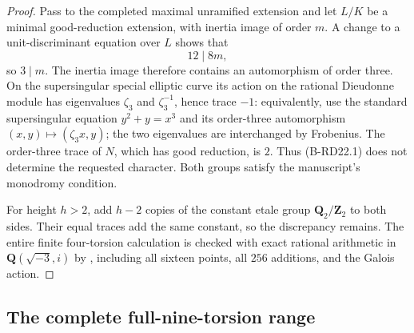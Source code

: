 \begin{proof}
Pass to the completed maximal unramified extension and let $L/K$
be a minimal good-reduction extension, with inertia image of order
$m$. A change to a unit-discriminant equation over $L$ shows that
\[
                            12\mid8m,
\]
so $3\mid m$. The inertia image therefore contains an automorphism
of order three. On the supersingular special elliptic curve its
action on the rational Dieudonne module has eigenvalues $\zeta_3$
and $\zeta_3^{-1}$, hence trace $-1$: equivalently, use the standard
supersingular equation $y^2+y=x^3$ and its order-three automorphism
$(x,y)\mapsto(\zeta_3x,y)$; the two eigenvalues are interchanged by
Frobenius. The order-three trace of $N$, which has good reduction,
is $2$. Thus (B-RD22.1) does not determine the requested character.
Both groups satisfy the manuscript's monodromy condition.

For height $h>2$, add $h-2$ copies of the constant etale group
$\mathbf Q_2/\mathbf Z_2$ to both sides. Their equal traces add the
same constant, so the discrepancy remains. The entire finite
four-torsion calculation is checked with exact rational arithmetic
in $\mathbf Q(\sqrt{-3},i)$ by
, including all sixteen
points, all $256$ additions, and the Galois action.
\end{proof}


\subsection{The complete full-nine-torsion range}

